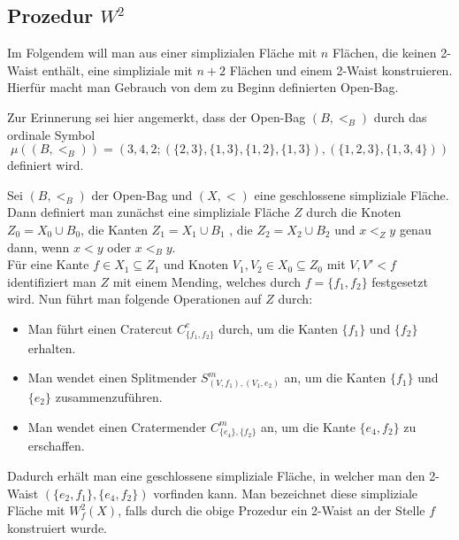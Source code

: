 \documentclass[12pt,titlepage]{article}
\begin{document}
 \subsection{Prozedur $W^2$}
Im Folgendem will man aus einer simplizialen Fläche mit $n$ Flächen, die keinen 2-Waist enthält, eine simpliziale mit $n+2$ Flächen und einem 2-Waist konstruieren. Hierfür macht man Gebrauch von dem zu Beginn definierten Open-Bag.
\begin{bemerkung}
Zur Erinnerung sei hier angemerkt, dass der Open-Bag $(B,<_B)$ durch das ordinale Symbol 
\[
\mu((B,<_B))=(3,4,2;(\{2,3\},\{1,3\},\{1,2\},\{1,3\}),(\{1,2,3\},\{1,3,4\}))
\] definiert wird.
\end{bemerkung}
 
Sei $(B,<_B)$ der Open-Bag und $(X,<)$ eine geschlossene simpliziale Fläche. Dann definiert man zunächst eine simpliziale Fläche $Z$ durch die Knoten $Z_0=X_0 \cup B_0$, die Kanten $Z_1=X_1 \cup B_1$ , die $Z_2=X_2 \cup B_2$ und $x<_Z y$ genau dann, wenn $x<y$ oder $x<_B y$.\\
Für eine Kante $f\in X_1 \subseteq Z_1$ und Knoten $V_1,V_2\in X_0\subseteq Z_0$ mit $V,V'<f$ identifiziert man $Z$ mit einem Mending, welches durch $f=\{f_1,f_2\}$ festgesetzt wird.
 Nun führt man folgende Operationen auf $Z$ durch:
\begin{itemize}
\item Man führt einen Cratercut $C_{\{f_1,f_2\}}^c$ durch, um die Kanten $\{f_1\}$ und $\{f_2\}$ erhalten.
\item Man wendet einen Splitmender $S^m_{(V,{f_1}),(V_1,e_2)}$ an, um die Kanten $\{f_1\}$ und $\{e_2\}$ zusammenzuführen.
\item Man wendet einen Cratermender $C_{\{e_4\},\{f_2\}}^m$ an, um die Kante $\{e_4,f_2\}$ zu erschaffen.
\end{itemize}
Dadurch erhält man eine geschlossene simpliziale Fläche, in welcher man den 2-Waist $(\{e_2,f_1\},\{e_4,f_2\})$ vorfinden kann. Man bezeichnet diese simpliziale Fläche mit \emph{$W^2_f(X)$}, falls durch die obige Prozedur ein 2-Waist an der Stelle $f$ konstruiert wurde.
\end{document}
